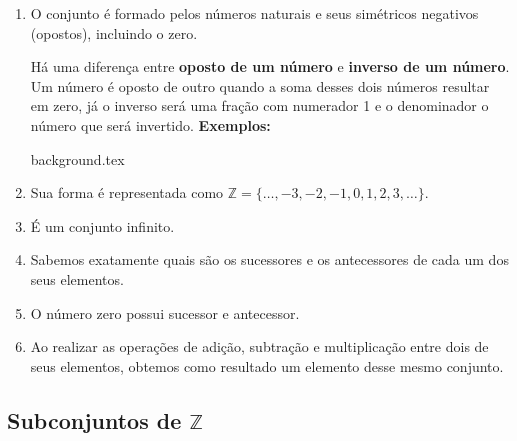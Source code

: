 \documentclass[10pt]{article}
\begin{document}
    \begin{enumerate}[label=\textbf{(\Roman*)}]
        \item O conjunto é formado pelos números naturais e seus simétricos negativos (opostos), incluindo o zero.
            \begin{obs}
                Há uma diferença entre \textbf{oposto de um número} e \textbf{inverso de um número}. Um número é oposto de outro quando a soma desses dois números resultar em zero, já o inverso será uma fração com numerador 1 e o denominador o número que será invertido.
                \textbf{Exemplos:}
                \begin{enumerate}
                \end{enumerate}
            \end{obs}
\newpage
{background.tex} %
        \item Sua forma é representada como \( \mathbb{Z} = \{\ldots, -3, -2, -1, 0, 1, 2, 3, \ldots\}\).
        \item É um conjunto infinito.
        \item Sabemos exatamente quais são os sucessores e os antecessores de cada um dos seus elementos.
        \item O número zero possui sucessor e antecessor.
        \item Ao realizar as operações de adição, subtração e multiplicação entre dois de seus elementos, obtemos como resultado um elemento desse mesmo conjunto.
    \end{enumerate}
\subsection*{Subconjuntos de \( \mathbb{Z} \)}
\end{document}

